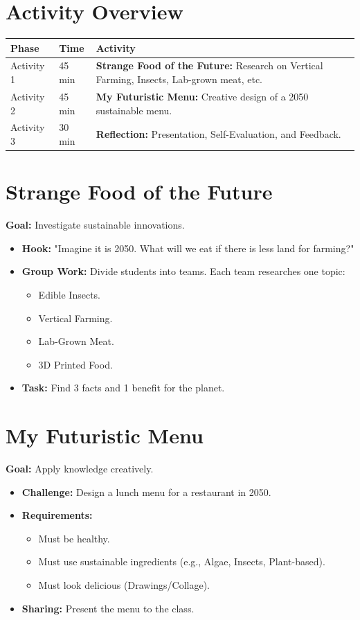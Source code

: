 \documentclass[11pt, a4paper]{article}
\begin{document}
\section*{Activity Overview}
\begingroup
\small
\begin{tabularx}{\textwidth}{|l|l|L|}
    \hline
     \textbf{Phase} & \textbf{Time} & \textbf{Activity} \\ \hline
    Activity 1 & 45 min & \textbf{Strange Food of the Future:} Research on Vertical Farming, Insects, Lab-grown meat, etc. \\ \hline
    Activity 2 & 45 min & \textbf{My Futuristic Menu:} Creative design of a 2050 sustainable menu. \\ \hline
    Activity 3 & 30 min & \textbf{Reflection:} Presentation, Self-Evaluation, and Feedback. \\ \hline
\end{tabularx}
\endgroup

\section{Strange Food of the Future}
\textbf{Goal:} Investigate sustainable innovations.
\begin{itemize}
    \item \textbf{Hook:} "Imagine it is 2050. What will we eat if there is less land for farming?"
    \item \textbf{Group Work:} Divide students into teams. Each team researches one topic:
    \begin{itemize}
        \item Edible Insects.
        \item Vertical Farming.
        \item Lab-Grown Meat.
        \item 3D Printed Food.
    \end{itemize}
    \item \textbf{Task:} Find 3 facts and 1 benefit for the planet.
\end{itemize}

\section{My Futuristic Menu}
\textbf{Goal:} Apply knowledge creatively.
\begin{itemize}
    \item \textbf{Challenge:} Design a lunch menu for a restaurant in 2050.
    \item \textbf{Requirements:}
    \begin{itemize}
        \item Must be healthy.
        \item Must use sustainable ingredients (e.g., Algae, Insects, Plant-based).
        \item Must look delicious (Drawings/Collage).
    \end{itemize}
    \item \textbf{Sharing:} Present the menu to the class.
\end{itemize}
\end{document}
